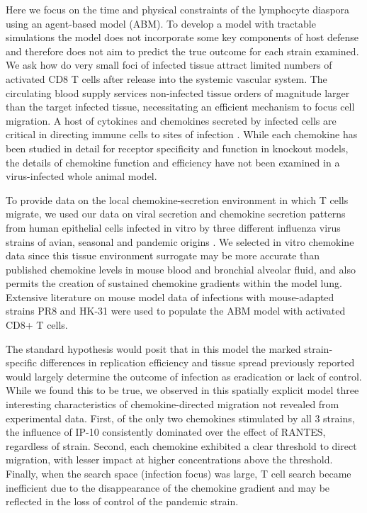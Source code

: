 \documentclass[10pt]{article}
\begin{document}
Here we focus on the time and physical constraints of the lymphocyte diaspora using an agent-based model (ABM).  To develop a model with tractable simulations the model does not incorporate some key components of host defense and therefore does not aim to predict the true outcome for each strain examined.   We ask how do very small foci of infected tissue attract limited numbers of activated CD8 T cells after release into the systemic vascular system.  The circulating blood supply services non-infected tissue orders of magnitude larger than the target infected tissue, necessitating an efficient mechanism to focus cell migration.   A host of cytokines and chemokines secreted by infected cells are critical in directing immune cells to sites of infection \cite{Miao2010, Zhao2000, LiJeon2002}.  While each chemokine has been studied in detail for receptor specificity and function in knockout models, the details of chemokine function and efficiency have not been examined in a virus-infected whole animal model.  

To provide data on the local chemokine-secretion environment in which T cells migrate, we used our data on viral secretion and chemokine secretion patterns from human epithelial cells infected in vitro by three different influenza virus strains of avian, seasonal and pandemic origins \cite{Mitchell2011}.   We selected in vitro chemokine data since this tissue environment surrogate may be more accurate than published chemokine levels in mouse blood and bronchial alveolar fluid, and also permits the creation of sustained chemokine gradients within the model lung.  Extensive literature on mouse model data of infections with mouse-adapted strains PR8 and HK-31 were used to populate the ABM model with activated CD8+ T cells. 

The standard hypothesis would posit that in this model the marked strain-specific differences in replication efficiency and tissue spread previously reported \cite{Mitchell2011} would largely determine the outcome of infection as eradication or lack of control.  While we found this to be true, we observed in this spatially explicit model three interesting characteristics of chemokine-directed migration not revealed from experimental data.  First, of the only two chemokines stimulated by all 3 strains, the influence of IP-10 consistently dominated over the effect of RANTES, regardless of strain.  Second, each chemokine exhibited a clear threshold to direct migration, with lesser impact at higher concentrations above the threshold.  Finally, when the search space (infection focus) was large, T cell search became inefficient due to the disappearance of the chemokine gradient and may be reflected in the loss of control of the pandemic strain.  
\end{document}
